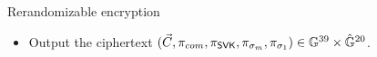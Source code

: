\begin{frame}{Rerandomizable encryption}
\begin{itemize}
      \item Output the ciphertext $(\vec{C},\pi_{com},\pi_{\mathsf{SVK}}, \pi_{\sigma_m}, \pi_{\sigma_1}) \in \mathbb{G}^{39} \times \hat{\mathbb{G}}^{20}$.
      \end{itemize}
 
 
\end{frame}
